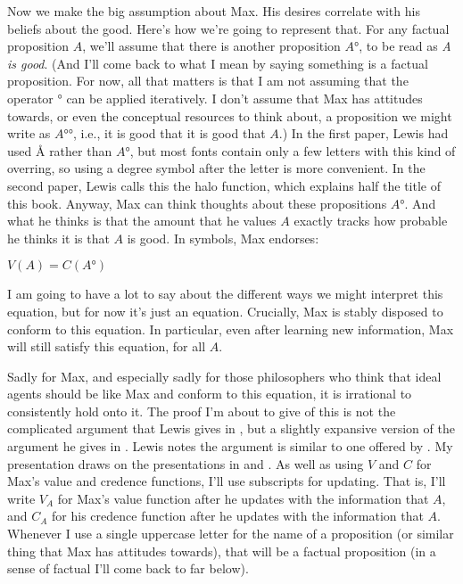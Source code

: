\documentclass[11pt,]{book}
\providecommand{\tightlist}{%
  \setlength{\itemsep}{0pt}\setlength{\parskip}{0pt}}
\begin{document}
Now we make the big assumption about Max. His desires correlate with his beliefs about the good. Here's how we're going to represent that. For any factual proposition \(A\), we'll assume that there is another proposition \(A°\), to be read as \emph{A is good}. (And I'll come back to what I mean by saying something is a factual proposition. For now, all that matters is that I am not assuming that the operator \(°\) can be applied iteratively. I don't assume that Max has attitudes towards, or even the conceptual resources to think about, a proposition we might write as \(A°°\), i.e., it is good that it is good that \(A\).) In the first paper, Lewis had used \(Å\) rather than \(A°\), but most fonts contain only a few letters with this kind of overring, so using a degree symbol after the letter is more convenient. In the second paper, Lewis calls this the halo function, which explains half the title of this book. Anyway, Max can think thoughts about these propositions \(A°\). And what he thinks is that the amount that he values \(A\) exactly tracks how probable he thinks it is that \(A\) is good. In symbols, Max endorses:

\begin{description}
\tightlist
\item[Desire as Belief (DaB)]
\(V(A) = C(A°)\)
\end{description}

I am going to have a lot to say about the different ways we might interpret this equation, but for now it's just an equation. Crucially, Max is stably disposed to conform to this equation. In particular, even after learning new information, Max will still satisfy this equation, for all \(A\).

Sadly for Max, and especially sadly for those philosophers who think that ideal agents should be like Max and conform to this equation, it is irrational to consistently hold onto it. The proof I'm about to give of this is not the complicated argument that Lewis gives in \citeyearpar{Lewis1988}, but a slightly expansive version of the argument he gives in \citeyearpar{Lewis1996}. Lewis notes the argument is similar to one offered by \citet{ArloCostaEtAl1995}. My presentation draws on the presentations in \citet{RussellHawthorne2016} and \citet{Collins2015}. As well as using \(V\) and \(C\) for Max's value and credence functions, I'll use subscripts for updating. That is, I'll write \(V_A\) for Max's value function after he updates with the information that \(A\), and \(C_A\) for his credence function after he updates with the information that \(A\). Whenever I use a single uppercase letter for the name of a proposition (or similar thing that Max has attitudes towards), that will be a factual proposition (in a sense of factual I'll come back to far below).
\end{document}
